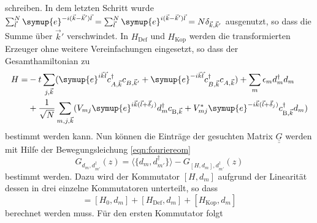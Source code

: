 schreiben.
In dem letzten Schritt wurde $\sum_{\vec{l}}^N \symup{e}^{-i(\vec{k}- \vec{k}')\vec{l}} 
= \sum_{\vec{l}}^N \symup{e}^{i(\vec{k}- \vec{k}')\vec{l}} = N\delta_{\vec{k}, \vec{k}'}$ ausgenutzt, so dass die Summe über $\vec{k}'$ verschwindet.
In $H_\text{Def}$ und $H_\text{Kop}$ werden die transformierten Erzeuger ohne weitere Vereinfachungen eingesetzt,  so dass der Gesamthamiltonian zu 
\begin{equation}
    \begin{split}
        H = &-t \sum_{j, \vec{k}} ( \symup{e}^{i\vec{k}\vec{l}}c^\dagger_{A,\vec{k}} c_{B,\vec{k}'} + 
            \symup{e}^{-i\vec{k}\vec{l}} c^\dagger_{B,\vec{k}}c_{A,\vec{k}}) + \sum_m \epsilon_m d_m^\dagger d_m \\
            &+ \frac{1}{\sqrt{N}}\sum_{m,j,\vec{k}} ( V_{mj}  \symup{e}^{i\vec{k}(\vec{l}+\vec{\delta}_j)} d_m^\dagger c_{\text{B},\vec{k}} 
            + V^*_{mj} \symup{e}^{-i\vec{k}(\vec{l}+\vec{\delta}_j)}c^\dagger_{\text{B},\vec{k}} d_m )
    \end{split}
    \end{equation}
bestimmt werden kann.
Nun können die Einträge der gesuchten Matrix $\underline{\underline{G}}$ werden mit Hilfe der Bewegungsleichung \eqref{eqn:fouriereom} 
\begin{equation*}
    G_{d_m, d_{m'}^\dagger}(z) = \langle \{ d_m, d_{m'}^\dagger \} \rangle - G_{[H,d_m], d_{m'}^\dagger} (z)
\end{equation*}
bestimmt werden.
Dazu wird der Kommutator $[H,d_m]$ aufgrund der Linearität dessen in drei einzelne Kommutatoren unterteilt, so dass
\begin{equation*}
    [H,d_m] = [H_0,d_m] + [H_\text{Def},d_m] +[H_\text{Kop},d_m] 
\end{equation*}
berechnet werden muss.
Für den ersten Kommutator folgt
